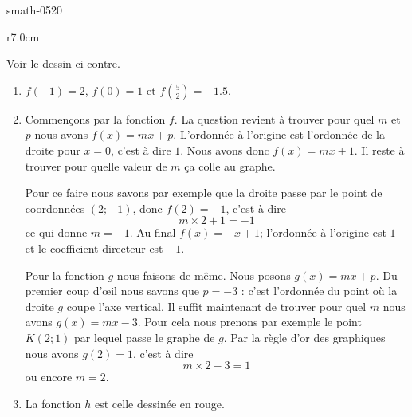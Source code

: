 
\begin{corrige}{smath-0520}

\begin{wrapfigure}{r}{7.0cm}
   \vspace{-0.5cm}        %
   \centering
   
\end{wrapfigure}

    Voir le dessin ci-contre.
    \begin{enumerate}
        \item
            \( f(-1)=2\), \( f(0)=1\) et \( f(\frac{ 5 }{2})=-1.5\).
        \item
            Commençons par la fonction \( f\). La question revient à trouver pour quel \( m\) et \( p\) nous avons \( f(x)=mx+p\). L'ordonnée à l'origine est l'ordonnée de la droite pour \( x=0\), c'est à dire \( 1\). Nous avons donc \( f(x)=mx+1\). Il reste à trouver pour quelle valeur de \( m\) ça colle au graphe. 
            
            Pour ce faire nous savons par exemple que la droite passe par le point de coordonnées \( (2;-1)\), donc \( f(2)=-1\), c'est à dire
            \begin{equation}
                m\times 2+1=-1
            \end{equation}
            ce qui donne \( m=-1\). Au final \( f(x)=-x+1\); l'ordonnée à l'origine est \( 1\) et le coefficient directeur est \( -1\).

            Pour la fonction \( g\) nous faisons de même. Nous posons \( g(x)=mx+p\). Du premier coup d'œil nous savons que \( p=-3\) : c'est l'ordonnée du point où la droite \( g\) coupe l'axe vertical. Il suffit maintenant de trouver pour quel \( m\) nous avons \( g(x)=mx-3\). Pour cela nous prenons par exemple le point \( K(2;1)\) par lequel passe le graphe de \( g\). Par la règle d'or des graphiques nous avons \( g(2)=1\), c'est à dire
            \begin{equation}
                m\times 2-3=1
            \end{equation}
            ou encore \( m=2\).
        \item
            La fonction \( h\) est celle dessinée en rouge.
    \end{enumerate}

\end{corrige}

